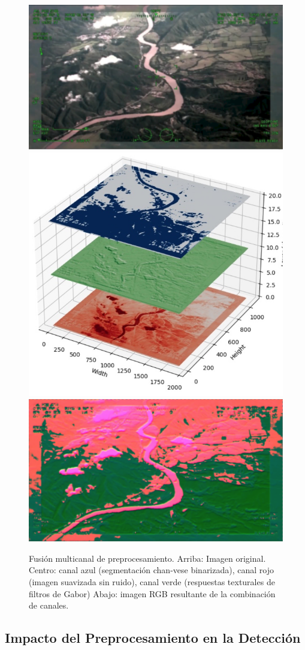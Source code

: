 \begin{figure}
\centering
\includegraphics[width=0.6\linewidth]{figures/original.png}
\hfill
\includegraphics[width=0.7\linewidth]{figures/fusion.jpeg}
\hfill
\includegraphics[width=0.6\linewidth]{figures/procesada.png}
\caption {Fusión multicanal de preprocesamiento. Arriba: Imagen original. Centro: canal azul (segmentación chan-vese binarizada), canal rojo (imagen suavizada sin ruido), canal verde (respuestas texturales de filtros de Gabor) Abajo: imagen RGB resultante de la combinación de canales.}

\label{Img:tratadas}
\end{figure}

\subsection{Impacto del Preprocesamiento en la Detección}

